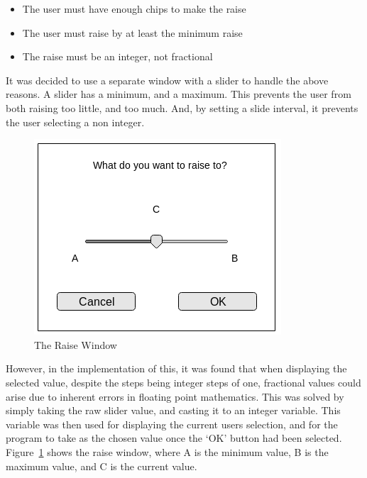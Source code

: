 \newpage

\begin{itemize}
\item The user must have enough chips to make the raise
\item The user must raise by at least the minimum raise
\item The raise must be an integer, not fractional
\end{itemize}

It was decided to use a separate window with a slider to handle the above
reasons. A slider has a minimum, and a maximum. This prevents the user from
both raising too little, and too much. And, by setting a slide interval, it
prevents the user selecting a non integer.

\begin{figure}[h]
    \centering
    \includegraphics[width=0.5\linewidth]{../images/raisewindow.png}
    \caption{The Raise Window}%
    \label{fig:raisewindow}
\end{figure}

However, in the implementation of this, it was found that when displaying
the selected value, despite the steps being integer steps of one, 
fractional values could arise due to inherent errors in floating point 
mathematics. This was solved by simply taking the raw slider value, and 
casting it to an integer variable. This variable was then used for displaying 
the current users selection, and for the program to take as the chosen value 
once the `OK' button had been selected. Figure~\ref{fig:raisewindow} shows the 
raise window, where A is the minimum value, B is the maximum value, and C is 
the current value.

